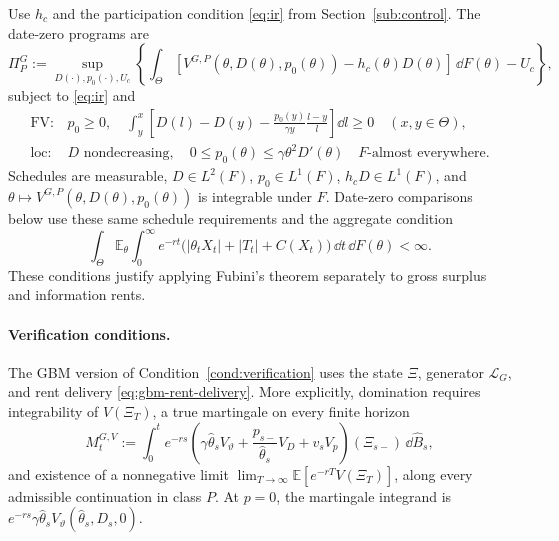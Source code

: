 \documentclass[12pt]{article}
\newcommand{\E}{\mathbb{E}}
\newcommand{\hth}{\hat\theta}
\newcommand{\hB}{\hat B}
\begin{document}
Use \(h_c\) and the participation condition \eqref{eq:ir} from
Section~\ref{sub:control}. The date-zero programs are
\begin{equation}\label{eq:gbm-program}
  \Pi_P^G:=\sup_{D(\cdot),p_0(\cdot),U_c}
    \left\{\int_\Theta
       [V^{G,P}(\theta,D(\theta),p_0(\theta))
                         -h_c(\theta)D(\theta)]\,\dd F(\theta)-U_c
    \right\},
\end{equation}
subject to \eqref{eq:ir} and
\begin{equation}\label{eq:gbm-program-constraints}
\begin{array}{ll}
\mathrm{FV}:&
 p_0\geq0,\quad
 \displaystyle\int_y^x\left[
   D(l)-D(y)-\frac{p_0(y)}{\gamma y}\frac{l-y}{l}
 \right]\dd l\geq0\quad(x,y\in\Theta),\\[8pt]
\mathrm{loc}:&
 D\text{ nondecreasing},\quad
 0\leq p_0(\theta)\leq\gamma\theta^2D'(\theta)
       \quad F\text{-almost everywhere}.
\end{array}
\end{equation}
Schedules are measurable, \(D\in L^2(F)\), \(p_0\in L^1(F)\),
\(h_cD\in L^1(F)\), and
\(\theta\mapsto V^{G,P}(\theta,D(\theta),p_0(\theta))\) is
integrable under \(F\). Date-zero comparisons below use these same
schedule requirements and the aggregate condition
\begin{equation}\label{eq:gbm-aggregate-integrability}
  \int_\Theta\E_\theta\int_0^\infty e^{-rt}
    \bigl(|\theta_tX_t|+|T_t|+C(X_t)\bigr)\,\dd t\,\dd F(\theta)
  <\infty.
\end{equation}
These conditions justify applying Fubini's theorem separately to
gross surplus and information rents.

\paragraph{Verification conditions.}
The GBM version of Condition~\ref{cond:verification} uses the state
\(\Xi\), generator \(\mathcal L_G\), and rent delivery
\eqref{eq:gbm-rent-delivery}. More explicitly, domination requires
integrability of \(V(\Xi_T)\), a true martingale on every finite
horizon
\begin{equation}\label{eq:gbm-verification-martingale}
  M_t^{G,V}:=\int_0^t e^{-rs}
    \left(\gamma\hth_s V_\vartheta
       +\frac{p_{s-}}{\hth_s}V_D+v_sV_p\right)(\Xi_{s-})\,\dd\hB_s,
\end{equation}
and existence of a nonnegative limit
\(\lim_{T\to\infty}\E[e^{-rT}V(\Xi_T)]\), along every admissible
continuation in class \(P\). At \(p=0\), the martingale integrand
is \(e^{-rs}\gamma\hth_s V_\vartheta(\hth_s,D_s,0)\).
\end{document}
